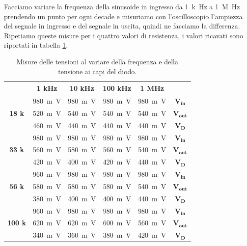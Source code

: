 \documentclass{report}
\begin{document}
Facciamo variare la frequenza della sinusoide in ingresso da \SI{1}{k\hertz} a \SI{1}{M\hertz} prendendo un punto per ogni decade e misuriamo con l'oscilloscopio l'ampiezza del segnale in ingresso e del segnale in uscita, quindi ne facciamo la differenza. Ripetiamo queste misure per i quattro valori di resistenza, i valori ricavati sono riportati in tabella \ref{table:misTensioni1}.
\begin{table}[h!]
	\centering
	\begin{tabular}{|c|c|c|c|c|c|}
		\cline{2-5} 
		\multicolumn{1}{c|}{} & \textbf{1 kHz} &  \textbf{10 kHz}  &  \textbf{100 kHz}  &  \textbf{1 MHz}  &\multicolumn{1}{c}{} \\ 
		\hline
		\multirow{3}{*}{\textbf{18 k\textOmega}} & \SI{980}{m\volt} & \SI{980}{m\volt} & \SI{980}{m\volt} & \SI{980}{m\volt} & $\mathbf{V_{in}}$ \\
		\cline{2-6}
		& \SI{520}{m\volt} & \SI{540}{m\volt} & \SI{540}{m\volt} & \SI{540}{m\volt} & $\mathbf{V_{out}}$\\
		\cline{2-6}
		& \SI{460}{m\volt} & \SI{440}{m\volt} & \SI{440}{m\volt} & \SI{440}{m\volt} & $\mathbf{V_D}$\\
		\hline
		\multirow{3}{*}{\textbf{33 k\textOmega}} & \SI{980}{m\volt} & \SI{980}{m\volt} & \SI{980}{m\volt} & \SI{980}{m\volt} & $\mathbf{V_{in}}$ \\
		\cline{2-6}
		& \SI{560}{m\volt} & \SI{580}{m\volt} & \SI{560}{m\volt} & \SI{540}{m\volt} & $\mathbf{V_{out}}$\\
		\cline{2-6}
		& \SI{420}{m\volt} & \SI{400}{m\volt} & \SI{420}{m\volt} & \SI{440}{m\volt} & $\mathbf{V_D}$\\
		\hline
		\multirow{3}{*}{\textbf{56 k\textOmega}} & \SI{960}{m\volt} & \SI{980}{m\volt} & \SI{980}{m\volt} & \SI{980}{m\volt} & $\mathbf{V_{in}}$ \\
		\cline{2-6}
		& \SI{580}{m\volt} & \SI{580}{m\volt} & \SI{580}{m\volt} & \SI{540}{m\volt} & $\mathbf{V_{out}}$\\
		\cline{2-6}
		& \SI{380}{m\volt} & \SI{400}{m\volt} & \SI{400}{m\volt} & \SI{440}{m\volt} & $\mathbf{V_D}$\\
		\hline
		\multirow{3}{*}{\textbf{100 k\textOmega}} & \SI{960}{m\volt} & \SI{980}{m\volt} & \SI{980}{m\volt} & \SI{980}{m\volt} & $\mathbf{V_{in}}$ \\
		\cline{2-6}
		& \SI{620}{m\volt} & \SI{620}{m\volt} & \SI{600}{m\volt} & \SI{560}{m\volt} & $\mathbf{V_{out}}$\\
		\cline{2-6}
		& \SI{340}{m\volt} & \SI{360}{m\volt} & \SI{380}{m\volt} & \SI{420}{m\volt} & $\mathbf{V_D}$\\
		\hline
	\end{tabular}
	\caption{Misure delle tensioni al variare della frequenza e della tensione ai capi del diodo.}
	\label{table:misTensioni1}
\end{table}
\end{document}
